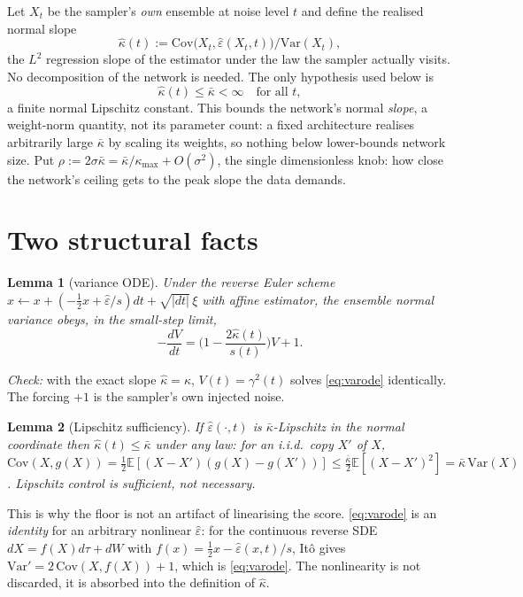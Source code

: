 \documentclass[10pt]{article}
\newcommand{\kb}{\bar\kappa}
\newcommand{\sigsq}{\sigma^2}
\newcommand{\E}{\mathbb{E}}
\newtheorem{lemma}{Lemma}
\begin{document}
Let $X_t$ be the sampler's \emph{own} ensemble at noise level $t$ and define the realised
normal slope
\[
\hat\kappa(t):=\mathrm{Cov}\big(X_t,\hat\varepsilon(X_t,t)\big)\big/\mathrm{Var}(X_t),
\]
the $L^2$ regression slope of the estimator under the law the sampler actually visits. No
decomposition of the network is needed. The only hypothesis used below is
\begin{equation}
\hat\kappa(t)\le\kb<\infty\quad\text{for all }t,
\label{eq:cap}
\end{equation}
a finite normal Lipschitz constant. This bounds the network's normal \emph{slope}, a
weight-norm quantity, not its parameter count: a fixed architecture realises arbitrarily large
$\kb$ by scaling its weights, so nothing below lower-bounds network size. Put
$\rho:=2\sigma\kb=\kb/\kappa_{\max}+O(\sigsq)$, the single dimensionless knob: how close the
network's ceiling gets to the peak slope the data demands.

\section{Two structural facts}
\begin{lemma}[variance ODE]\label{lem:ode}
Under the reverse Euler scheme $x\!\leftarrow\!x+(-\tfrac12x+\hat\varepsilon/s)dt+\sqrt{|dt|}\,\xi$
with affine estimator, the ensemble normal variance obeys, in the small-step limit,
\begin{equation}
-\frac{dV}{dt}=\Big(1-\frac{2\hat\kappa(t)}{s(t)}\Big)V+1 .
\label{eq:varode}
\end{equation}
\end{lemma}
\noindent\emph{Check:} with the exact slope $\hat\kappa=\kappa$, $V(t)=\gamma^2(t)$ solves
\eqref{eq:varode} identically. The forcing $+1$ is the sampler's own injected noise.

\begin{lemma}[Lipschitz sufficiency]\label{lem:shield}
If $\hat\varepsilon(\cdot,t)$ is $\kb$-Lipschitz in the normal coordinate then
$\hat\kappa(t)\le\kb$ under any law: for an i.i.d.\ copy $X'$ of $X$,
$\mathrm{Cov}(X,g(X))=\tfrac12\E[(X-X')(g(X)-g(X'))]\le\tfrac{\kb}{2}\E[(X-X')^2]
=\kb\,\mathrm{Var}(X)$. Lipschitz control is sufficient, not necessary.
\end{lemma}
\noindent This is why the floor is not an artifact of linearising the score. \eqref{eq:varode}
is an \emph{identity} for an arbitrary nonlinear $\hat\varepsilon$: for the continuous reverse
SDE $dX=f(X)d\tau+dW$ with $f(x)=\tfrac12x-\hat\varepsilon(x,t)/s$, It\^o gives
$\mathrm{Var}'=2\,\mathrm{Cov}(X,f(X))+1$, which is \eqref{eq:varode}. The nonlinearity is not
discarded, it is absorbed into the definition of $\hat\kappa$.
\end{document}

